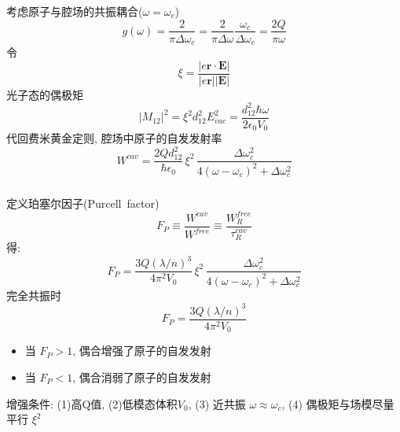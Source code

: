     \begin{frame} 
    \frametitle{}
    考虑原子与腔场的共振耦合($\omega = \omega_c$)
    \[ g(\omega)  = \frac{2}{\pi \Delta \omega_c} = \frac{2}{\pi \Delta \omega} \frac{\omega_c}{\Delta \omega_c} = \frac{2Q}{\pi \omega} \]
    令 \[\xi = \frac{\left| e \mathbf{r} \cdot \mathbf{E} \right|}{\left|e \mathbf{r}\right| \left| \mathbf{E}\right|} \]
    光子态的偶极矩 
    \[ \left|M_{12}\right|^2 = \xi^2 d^2_{12} E^2_{vac} = \frac{d^2_{12} \hbar \omega}{2 \epsilon_0 V_0}\]
    代回费米黄金定则, 腔场中原子的自发发射率
    \[ W^{cav} =  \frac{ 2 Q d^2_{12}}{ \hbar \epsilon_0 } \, \xi^2  \,  \frac{\Delta \omega_c ^2}{4(\omega -\omega_c)^2 +\Delta \omega_c ^2} \]
    \end{frame}

    \begin{frame} 
    \frametitle{}
        定义珀塞尔因子(Purcell~factor)
        \[ F_P \equiv  \frac{W^{cav}}{W^{free}} \equiv \frac{W^{free} _R }{\tau^{cav} _R} \]
        得:
        \[ F_P = \frac{ 3 Q (\lambda /n) ^3}{ 4 \pi^2 V_0 } \, \xi^2  \,  \frac{\Delta \omega_c ^2}{4(\omega -\omega_c)^2 +\Delta \omega_c ^2}  \]
        完全共振时
        \[ F_P = \frac{ 3 Q (\lambda /n) ^3}{ 4 \pi^2 V_0 }  \]
        \begin{itemize}
            \item 当 $F_P > 1$, 偶合增强了原子的自发发射
            \item 当 $F_P < 1$, 偶合消弱了原子的自发发射
        \end{itemize}  
        {\Bullet}增强条件: (1)高Q值, (2)低模态体积$V_0$, (3) 近共振 $\omega \approx \omega_c$, (4) 偶极矩与场模尽量平行 $\xi ^2$
    \end{frame}

